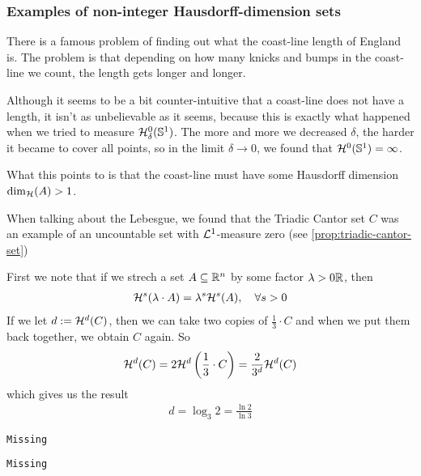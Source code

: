 \subsubsection*{Examples of non-integer Hausdorff-dimension sets}

There is a famous problem of finding out what the coast-line length of England is.
The problem is that depending on how many knicks and bumps in the coast-line we count, the length gets longer and longer.

Although it seems to be a bit counter-intuitive that a coast-line does not have a length, it isn't as unbelievable as it seems, because this is exactly what happened when we tried to measure $\mathcal{H}_{\delta}^{0}(\mathbb{S}^{1})$.
The more and more we decreased $\delta$, the harder it became to cover all points, so in the limit $\delta \to 0$, we found that $\mathcal{H}^{0}(\mathbb{S}^{1}) = \infty$.

What this points to is that the coast-line must have some Hausdorff dimension $\dim_{\mathcal{H}}(A) > 1$.


\begin{ex}
  When talking about the Lebesgue, we found that the Triadic Cantor set $C$ was an example of an uncountable set with $\mathcal{L}^{1}$-measure zero (see \ref{prop:triadic-cantor-set})

  First we note that if we strech a set $A \subseteq \mathbb{R}^{n}$ by some factor $\lambda > 0\mathbb{R}$, then
  \begin{align*}
    \mathcal{H}^{s}(\lambda \cdot A) = \lambda^{s} \mathcal{H}^{s}(A), \quad \forall s > 0
  \end{align*}
  If we let $d := \mathcal{H}^{d}(C)$, then we can take two copies of $\frac{1}{3} \cdot C$ and when we put them back together, we obtain $C$ again. So
  \begin{align*}
    \mathcal{H}^{d}(C) = 2 \mathcal{H}^{d}\left(
      \frac{1}{3} \cdot C
    \right)
    = \frac{2}{3^{d}} \mathcal{H}^{d}(C)
  \end{align*}
  which gives us the result
  \begin{align*}
    d = \log_3 2 = \frac{\ln 2}{\ln 3}
  \end{align*}
\end{ex}


\begin{ex}
\texttt{Missing}
\end{ex}


\begin{ex}
\texttt{Missing}
\end{ex}





